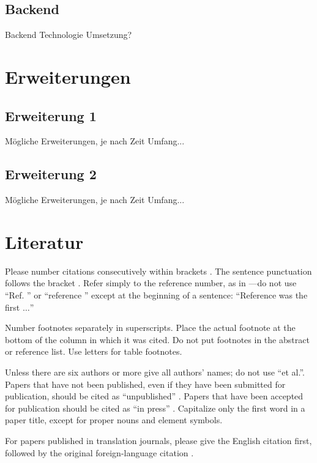 \documentclass[conference]{IEEEtran}
\begin{document}
\subsection{Backend}
Backend Technologie
Umsetzung?

\section{Erweiterungen}
\subsection{Erweiterung 1}
Mögliche Erweiterungen, je nach Zeit Umfang...

\subsection{Erweiterung 2}
Mögliche Erweiterungen, je nach Zeit Umfang...

\section*{Literatur}

Please number citations consecutively within brackets \cite{b1}. The 
sentence punctuation follows the bracket \cite{b2}. Refer simply to the reference 
number, as in \cite{b3}---do not use ``Ref. \cite{b3}'' or ``reference \cite{b3}'' except at 
the beginning of a sentence: ``Reference \cite{b3} was the first $\ldots$''

Number footnotes separately in superscripts. Place the actual footnote at 
the bottom of the column in which it was cited. Do not put footnotes in the 
abstract or reference list. Use letters for table footnotes.

Unless there are six authors or more give all authors' names; do not use 
``et al.''. Papers that have not been published, even if they have been 
submitted for publication, should be cited as ``unpublished'' \cite{b4}. Papers 
that have been accepted for publication should be cited as ``in press'' \cite{b5}. 
Capitalize only the first word in a paper title, except for proper nouns and 
element symbols.

For papers published in translation journals, please give the English 
citation first, followed by the original foreign-language citation \cite{b6}.
\end{document}
